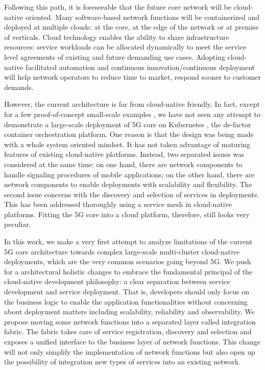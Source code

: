 \documentclass[conference]{IEEEtran}
\begin{document}
Following this path, it is foreseeable that the future core network will be
cloud-native oriented\cite{telco}. Many software-based network functions will
be containerized and deployed at multiple clouds: at the core, at the edge of
the network or at premise of verticals. Cloud technology enables the ability to
share infrastructure resources: service workloads can be allocated dynamically
to meet the service level agreements of existing and future demanding use
cases. Adopting cloud-native facilitated automation and continuous
innovation/continuous deployment will help network operators to reduce time to
market, respond sooner to customer demands.

However, the current architecture is far from cloud-native friendly.  In fact,
except for a few proof-of-concept small-scale examples \cite{kube5g}, we have
not seen any attempt to demonstrate a large-scale deployment of 5G core on
Kubernetes \cite{ku8}, the de-factor container orchestration platform. One
reason is that the design was being made with a whole system oriented mindset.
It has not taken advantage of maturing features of existing cloud-native
platforms.  Instead, two separated issues was considered at the same time: on
one hand, there are network components to handle signaling procedures of mobile
applications; on the other hand, there are network components to enable
deployments with scalability and flexibility. The second issue concerns with
the discovery and selection of services in deployments.  This has been
addressed thoroughly using a service mesh \cite{mesh} in cloud-native
platforms. Fitting the 5G core into a cloud platform, therefore, still looks
very peculiar.


In this work, we make a very first attempt to analyze limitations of the
current 5G core architecture towards complex large-scale multi-cluster
cloud-native deployments, which are the very common scenarios going beyond 5G.
We push for a architectural holistic changes to embrace the fundamental
principal of the cloud-native development philosophy: a clear separation
between service development and service deployment. That is, developers should
only focus on the business logic to enable the application functionalities
without concerning about deployment matters including scalability, reliability
and observability.  We propose moving some network functions into a separated
layer called integration fabric. The fabric takes care of service registration,
discovery and selection and exposes a unified interface to the business layer
of network functions. This change will not only simplify the implementation of
network functions but also open up the possibility of integration new types of
services into an existing network.
\end{document}
